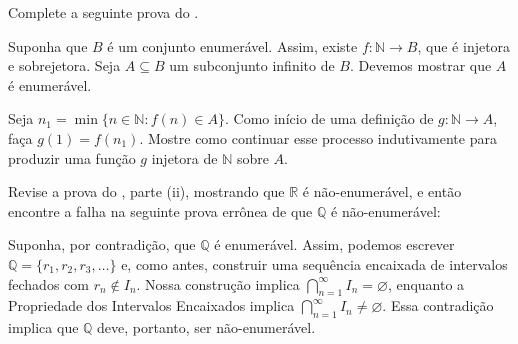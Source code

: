 \begin{exercise}\label{ex:completar-prova-subconjunto}
Complete a seguinte prova do .

Suponha que $B$ é um conjunto enumerável. Assim, existe $f \colon \mathbb{N} \to B$, que é injetora e sobrejetora. Seja $A \subseteq B$ um subconjunto infinito de $B$. Devemos mostrar que $A$ é enumerável.

Seja $n_{1} = \min\{n \in \mathbb{N} : f(n) \in A\}$. Como início de uma definição de $g \colon \mathbb{N} \to A$, faça $g(1) = f(n_{1})$. Mostre como continuar esse processo indutivamente para produzir uma função $g$ injetora de $\mathbb{N}$ sobre $A$. 
\end{exercise}

\begin{exercise}\label{ex:falha-prova-Q-nao-enumeravel}
Revise a prova do , parte (ii), mostrando que $\mathbb{R}$ é não-enumerável, e então encontre a falha na seguinte prova errônea de que $\mathbb{Q}$ é não-enumerável:

Suponha, por contradição, que $\mathbb{Q}$ é enumerável. Assim, podemos escrever $\mathbb{Q} = \{r_{1}, r_{2}, r_{3}, \dots\}$ e, como antes, construir uma sequência encaixada de intervalos fechados com $r_{n} \notin I_{n}$. Nossa construção implica $\bigcap_{n=1}^{\infty} I_{n} = \varnothing$, enquanto a Propriedade dos Intervalos Encaixados implica $\bigcap_{n=1}^{\infty} I_{n} \neq \varnothing$. Essa contradição implica que $\mathbb{Q}$ deve, portanto, ser não-enumerável.
\end{exercise}


\break 

